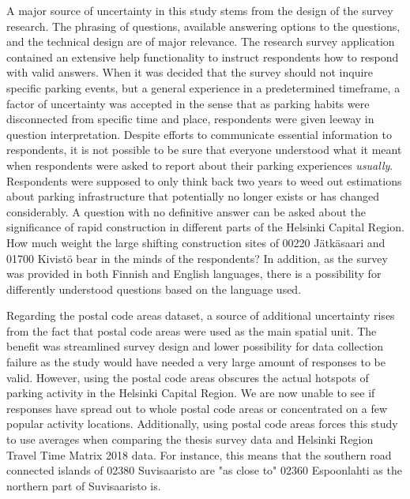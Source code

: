 A major source of uncertainty in this study stems from the design of the survey research. The phrasing of questions, available answering options to the questions, and the technical design are of major relevance. The research survey application contained an extensive help functionality to instruct respondents how to respond with valid answers. When it was decided that the survey should not inquire specific parking events, but a general experience in a predetermined timeframe, a factor of uncertainty was accepted in the sense that as parking habits were disconnected from specific time and place, respondents were given leeway in question interpretation. Despite efforts to communicate essential information to respondents, it is not possible to be sure that everyone understood what it meant when respondents were asked to report about their parking experiences \textit{usually}. Respondents were supposed to only think back two years to weed out estimations about parking infrastructure that potentially no longer exists or has changed considerably. A question with no definitive answer can be asked about the significance of rapid construction in different parts of the Helsinki Capital Region. How much weight the large shifting construction sites of 00220 Jätkäsaari and 01700 Kivistö bear in the minds of the respondents? In addition, as the survey was provided in both Finnish and English languages, there is a possibility for differently understood questions based on the language used.

Regarding the postal code areas dataset, a source of additional uncertainty rises from the fact that postal code areas were used as the main spatial unit. The benefit was streamlined survey design and lower possibility for data collection failure as the study would have needed a very large amount of responses to be valid. However, using the postal code areas obscures the actual hotspots of parking activity in the Helsinki Capital Region. We are now unable to see if responses have spread out to whole postal code areas or concentrated on a few popular activity locations. Additionally, using postal code areas forces this study to use averages when comparing the thesis survey data and Helsinki Region Travel Time Matrix 2018 data. For instance, this means that the southern road connected islands of 02380 Suvisaaristo are "as close to" 02360 Espoonlahti as the northern part of Suvisaaristo is.

